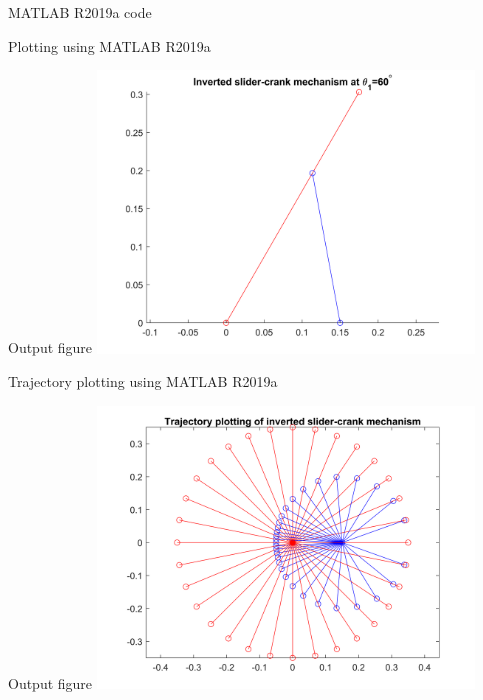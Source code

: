 \begin{frame}{MATLAB R2019a code}

\end{frame}
\begin{frame}{Plotting using MATLAB R2019a}

\end{frame}
\begin{frame}{Output figure}
\centering
\includegraphics[width=100mm]{images/Inverted-RRRT-plot.png}
\end{frame}
\begin{frame}{Trajectory plotting using MATLAB R2019a}

\end{frame}
\begin{frame}{Output figure}
\centering
\includegraphics[width=100mm]{images/Inverted-RRRT-trajectory.png}
\end{frame}
